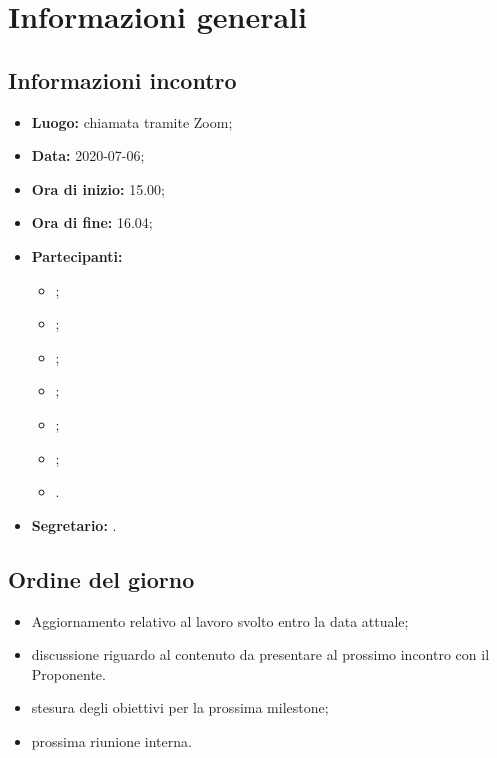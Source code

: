 \section{Informazioni generali}
\subsection{Informazioni incontro}
\begin{itemize}
	\item \textbf{Luogo:} chiamata tramite Zoom;
	\item \textbf{Data:} 2020-07-06;
	\item \textbf{Ora di inizio:} 15.00;
	\item \textbf{Ora di fine:} 16.04;
	\item \textbf{Partecipanti:}
		\begin{itemize}
			\item \VB;
			\item \NF;
			\item \EG;
			\item \FJ;
			\item \MP;
			\item \AS;
			\item \AZ.
		\end{itemize}
	\item \textbf{Segretario:} \NF.
\end{itemize}

\subsection{Ordine del giorno}
\begin{itemize}
	\item Aggiornamento relativo al lavoro svolto entro la data attuale;
	\item discussione riguardo al contenuto da presentare al prossimo incontro con il Proponente.
	\item stesura degli obiettivi per la prossima milestone\textit{};
	\item prossima riunione interna.
\end{itemize}
